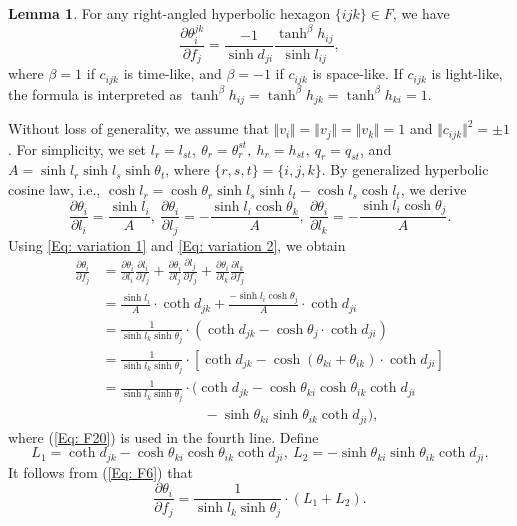 \documentclass[12pt]{amsart}
\theoremstyle{definition}
\newtheorem{lemma}[theorem]{Lemma}
\begin{document}
\begin{lemma}\label{Lem: angle variations 1}
For any right-angled hyperbolic hexagon $\{ijk\}\in F$, we have
\begin{equation}\label{Eq: angle 1}
\frac{\partial \theta^{jk}_i}{\partial f_j}
=\frac{-1}{\sinh d_{ji}}\frac{\tanh^\beta h_{ij}}{\sinh l_{ij}},
\end{equation}
where $\beta=1$ if $c_{ijk}$ is time-like, and $\beta=-1$ if $c_{ijk}$ is space-like.
If $c_{ijk}$ is light-like, the formula is interpreted as $\tanh^\beta h_{ij}=\tanh^\beta h_{jk}=\tanh^\beta h_{ki}=1$.
\end{lemma}
\proof
Without loss of generality, we assume that $\Vert v_i\Vert =\Vert v_j\Vert =\Vert v_k\Vert =1$ and $\Vert c_{ijk}\Vert ^2=\pm1$.
For simplicity, we set $l_r=l_{st},\ \theta_r=\theta^{st}_r,\ h_r=h_{st},\ q_r=q_{st}$, and $A=\sinh l_r\sinh l_s\sinh \theta_t$, where $\{r,s,t\}=\{i,j,k\}$.
By generalized hyperbolic cosine law, i.e.,
$\cosh l_r
=\cosh \theta_r\sinh l_s\sinh l_t-\cosh l_s\cosh l_t$,
we derive
\begin{equation}\label{Eq: F24}
\frac{\partial\theta_i}{\partial l_i}=\frac{\sinh l_i}{A},\
\frac{\partial\theta_i}{\partial l_j}=-\frac{\sinh l_i\cosh \theta_k}{A},\
\frac{\partial\theta_i}{\partial l_k}=-\frac{\sinh l_i\cosh \theta_j}{A}.
\end{equation}
Using \eqref{Eq: variation 1} and \eqref{Eq: variation 2}, we obtain
\begin{equation}\label{Eq: F6}
\begin{aligned}
\frac{\partial \theta_i}{\partial f_j}
&=\frac{\partial \theta_i}{\partial l_i}\frac{\partial l_i}{\partial f_j}
+\frac{\partial \theta_i}{\partial l_j}\frac{\partial l_j}{\partial f_j}
+\frac{\partial \theta_i}{\partial l_k}\frac{\partial l_k}{\partial f_j}\\
&=\frac{\sinh l_i}{A}\cdot\coth d_{jk}
+\frac{-\sinh l_i\cosh \theta_j}{A}\cdot\coth d_{ji}\\
&=\frac{1}{\sinh l_k\sinh \theta_j}\cdot\left(\coth d_{jk}-\cosh \theta_j\cdot\coth d_{ji}\right)\\
&=\frac{1}{\sinh l_k\sinh \theta_j}\cdot\left[\coth d_{jk}-\cosh (\theta_{ki}+\theta_{ik})\cdot\coth d_{ji}\right]\\
&=\frac{1}{\sinh l_k\sinh \theta_j}\cdot(\coth d_{jk}-\cosh \theta_{ki}\cosh\theta_{ik}\coth d_{ji}\\
&\ \ \ \ \ \ \ \ \ \ \ \ \ \ \ \ \ \ \ \ \ \ \ \ \ \ \ \ \ \ \ \ \ -\sinh \theta_{ki}\sinh\theta_{ik}\coth d_{ji}),
\end{aligned}
\end{equation}
where (\ref{Eq: F20}) is used in the fourth line.
Define
\begin{equation}\label{Eq: F21}
L_1=\coth d_{jk}-\cosh \theta_{ki}\cosh\theta_{ik}\coth d_{ji},\ L_2=-\sinh \theta_{ki}\sinh\theta_{ik}\coth d_{ji}.
\end{equation}
It follows from (\ref{Eq: F6}) that
\begin{equation}\label{Eq: F22}
\frac{\partial \theta_i}{\partial f_j}=\frac{1}{\sinh l_k\sinh \theta_j}\cdot(L_1+L_2).
\end{equation}
\end{document}
